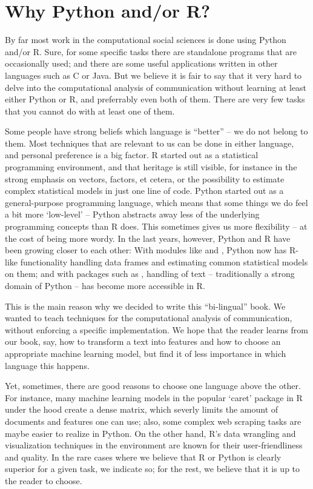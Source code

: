 \section{Why Python and/or R?}
By far most work in the computational social sciences is done using
Python and/or R. Sure, for some specific tasks there are standalone
programs that are occasionally used; and there are some useful applications
written in other languages such as C or Java. But we believe it is
fair to say that it very hard to delve into the computational analysis
of communication without learning at least either Python or R, and
preferrably even both of them.
There are very few tasks that you cannot do with at least one of them.

Some people have strong beliefs which language is ``better'' -- we do
not belong to them. Most techniques that are relevant to us can be
done in either language, and personal preference is a big factor. R
started out as a statistical programming environment, and that
heritage is still visible, for instance in the strong emphasis on
vectors, factors, et cetera, or the possibility to estimate complex
statistical models in just one line of code. Python started out as a
general-purpose programming language, which means that some things we
do feel a bit more `low-level' -- Python abstracts away less of the
underlying programming concepts than R does. This sometimes gives us
more flexibility -- at the cost of being more wordy.
In the last years, however, Python and R have been
growing closer to each other: With modules like  and
, Python now has R-like functionality handling data
frames and estimating common statistical models on them; and with
packages such as , handling of text -- traditionally a
strong domain of Python -- has become more accessible in R.

This is the main reason why we decided to write this ``bi-lingual''
book. We wanted to teach techniques for the computational analysis of
communication, without enforcing a specific implementation. We hope
that the reader learns from our book, say, how to transform a text
into features and how to choose an appropriate machine learning model,
but find it of less importance in which language this happens.

Yet, sometimes, there are good reasons to choose one language above
the other. For instance, many machine learning models in the popular `caret' package in R under the
hood create a dense matrix, which severly limits the amount of
documents and features one can use; also, some complex web scraping
tasks are maybe easier to realize in Python. On the other hand, R's
data wrangling and visualization techniques in the 
environment are known for their user-friendliness and quality.  In the
rare cases where we believe that R or Python is clearly superior for a
given task, we indicate so; for the rest, we believe that it is up to
the reader to choose.


